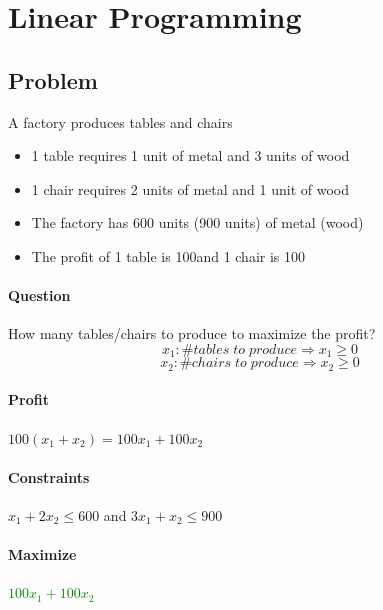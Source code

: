 \section{Linear Programming}

\subsection{Problem}
A factory produces tables and chairs
\begin{itemize}
	\item 1 table requires 1 unit of metal and 3 units of wood
	\item 1 chair requires 2 units of metal and 1 unit of wood
	\item The factory has 600 units (900 units) of metal (wood)
	\item The profit of 1 table is 100\EUR and 1 chair is 100\EUR
\end{itemize}
\paragraph{Question} How many tables/chairs to produce to maximize the profit?
$$x_1: \#tables \; to \; produce \Rightarrow x_1 \geq 0$$
$$x_2: \#chairs \; to \; produce \Rightarrow x_2 \geq 0$$
\paragraph{Profit} $100(x_1+x_2) = 100 x_1 + 100 x_2$
\paragraph{Constraints} $x_1 + 2x_2 \leq 600$ and $3x_1+x_2 \leq 900$
\paragraph{Maximize}  \textcolor{green}{$100x_1+100x_2$} 
